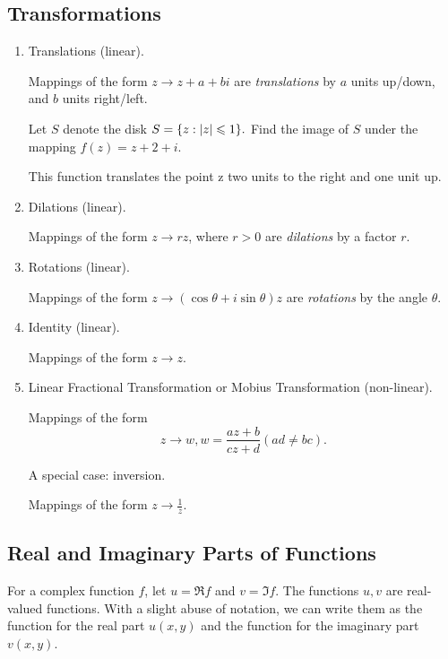 \documentclass[11pt,reqno,oneside,a4paper]{article}
\begin{document}
\subsection{Transformations}
\begin{enumerate}
	\item Translations (linear). 
	
	Mappings of the form $z\to z+a+bi$ are \textit{translations} by $a$ units up/down, and $b$ units right/left.
	
	\begin{eg}
		Let $S$ denote the disk $S = \{z:\left\lvert z\right\rvert \leqslant 1\}.$ Find the image of $S$ under the mapping $f(z) = z+2+i$. 
		
		This function translates
		the point z two units to the right and one unit up.
	\end{eg} 
	
	\item Dilations (linear). 
	
	Mappings of the form $z\to rz$, where $r>0$ are \textit{dilations} by a factor $r$. 
	
	\item Rotations (linear).
	
	Mappings of the form $z \to (\cos\theta + i \sin \theta) z$ are \textit{rotations} by the angle $\theta$.
	
	\item Identity (linear). 
	
	Mappings of the form $z\to z$. 
	
	\item Linear Fractional Transformation or Mobius Transformation (non-linear).
	
	Mappings of the form $$z\to w, w = \frac{az+b}{cz+d} (ad\neq bc).$$
	
	\subitem A special case: inversion.

	Mappings of the form $z \to \frac{1}{z}.$
\end{enumerate}

\subsection{Real and Imaginary Parts of Functions}

\par For a complex function $f$, let $u = \Re f$ and $v = \Im f.$ The functions $u,v$ are real-valued functions. With a slight abuse of notation, we can write them as the function for the real part $u(x,y)$ and the function for the imaginary part $v(x,y).$
\end{document}

